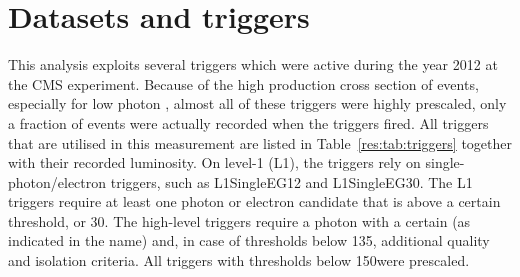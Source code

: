 \section{Datasets and triggers}
\label{res:sec:DatasetsAndTriggers}
\renewcommand{\arraystretch}{1.5}
\begin{table}[!b]
\centering
\caption{Single-photon triggers together with the recorded luminosity taking the prescales of the triggers into consideration.}
\label{res:tab:triggers}
\end{table}  
This analysis exploits several triggers which were active during the year 2012 at the CMS experiment.
Because of the high production cross section of \GAMJET events, especially for low photon \pt, almost all of these triggers were highly prescaled, \ie only a fraction of events were actually recorded when the triggers fired.
All triggers that are utilised in this measurement are listed in Table~\ref{res:tab:triggers} together with their recorded luminosity.
On level-1 (L1), the triggers rely on single-photon/electron triggers, such as L1SingleEG12 and L1SingleEG30.
The L1 triggers require at least one photon or electron candidate that is above a certain \et threshold, \gev or 30\gev.
The high-level triggers require a photon with a certain \pt (as indicated in the name) and, in case of thresholds below 135\gev, additional quality and isolation criteria. 
All triggers with thresholds below 150\gev were prescaled.

